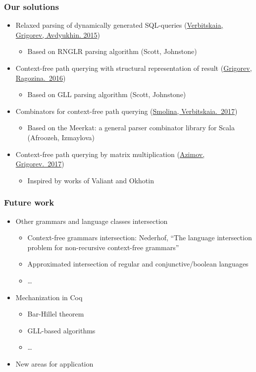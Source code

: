 \documentclass{beamer}
\begin{document}
\begin{frame}
  \transwipe[direction=90]
  \frametitle{Our solutions}
  \begin{itemize}
    \item Relaxed parsing of dynamically generated SQL-queries (\href{https://link.springer.com/chapter/10.1007/978-3-319-41579-6\_22}{Verbitskaia, Grigorev, Avdyukhin. 2015})
    \begin{itemize}
        \item Based on RNGLR parsing algorithm (Scott, Johnstone)
    \end{itemize}
    \item Context-free path querying with structural representation of result (\href{https://arxiv.org/abs/1612.08872}{Grigorev, Ragozina.~2016})
    \begin{itemize}
        \item Based on GLL parsing algorithm (Scott, Johnstone)
    \end{itemize}
    \item Combinators for context-free path querying (\href{http://plc.sfedu.ru/files/PLC-2017-proceedings.pdf\#page=233}{Smolina, Verbitskaia.~2017})
    \begin{itemize}
        \item Based on the Meerkat: a general parser combinator library for Scala (Afroozeh, Izmaylova)
    \end{itemize}
    \item Context-free path querying by matrix multiplication (\href{https://arxiv.org/abs/1707.01007}{Azimov, Grigorev.~2017})
    \begin{itemize}
        \item Inspired by works of Valiant and Okhotin
    \end{itemize}
  \end{itemize}
\end{frame}

\begin{frame}[fragile]
\transwipe[direction=90]
\frametitle{Future work}
\begin{itemize}
  \item Other grammars and language classes intersection
  \begin{itemize}
     \item Context-free grammars intersection: Nederhof, ``The language intersection problem for non-recursive context-free grammars''
     \item Approximated intersection of regular and conjunctive/boolean languages
     \item \dots
  \end{itemize}
  \item Mechanization in Coq
  \begin{itemize}
     \item Bar-Hillel theorem
     \item GLL-based algorithms
     \item \dots
  \end{itemize}
  \item New areas for application
\end{itemize}
\end{frame}
            
\end{document}
